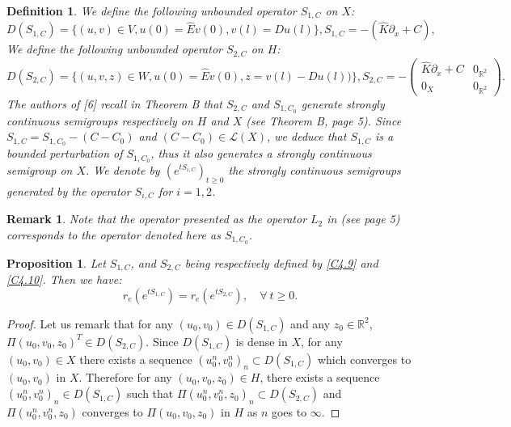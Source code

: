 \documentclass[10pt, english]{article}
\newtheorem{prop}[thm]{Proposition}
\newtheorem{dfn}[thm]{Definition}
\newtheorem{oss}[thm]{Remark}
\begin{document}
{\begin{dfn}
We define the following unbounded operator $S_{1,C}$ on $X$:
\begin{equation}\label{C4.9}%
D(S_{1,C})=\{(u,v) \in V, u(0)=\widehat{E}v(0), v(l)=Du(l)\}, S_{1,C}=-(\widehat{K}\partial_x +C),
\end{equation}
We define the following unbounded operator $S_{2,C}$ on $H$:
\begin{equation}\label{C4.10}%
D(S_{2,C})=\{(u,v,z) \in W, u(0)=\widehat{E}v(0), z=v(l)-Du(l))\}, S_{2,C}=
-\begin{pmatrix}
\widehat{K}\partial_x +C  & 0_{\mathbb{R}^2}\\
0_X & 0_{\mathbb{R}^2}
\end{pmatrix}.
\end{equation}
The authors of [6] recall in Theorem B that $S_{2,C}$ and $S_{1,C_0}$ generate strongly continuous semigroups respectively on $H$ and $X$ (see Theorem B, page 5). Since $S_{1,C}=S_{1,C_0} -(C-C_0)$ and $(C-C_0) \in \mathcal{L}(X)$, we deduce that $S_{1,C}$ is a bounded perturbation of $S_{1,C_0}$, thus it also generates a strongly continuous semigroup on $X$.
We denote by $(e^{tS_{i,C}})_{t \geqslant 0}$ the strongly continuous semigroups generated by the operator $S_{i,C}$ for $i=1,2$.
\end{dfn}
\begin{oss}\label{L2C_0}
Note that the operator presented as the operator $L_2$ in \cite{SW2003} (see page 5) corresponds to the operator denoted here as $S_{1,C_0}$.
\end{oss}

\begin{prop}\label{P1}
Let $S_{1,C}$, and $S_{2,C}$ being respectively defined by \eqref{C4.9} and \eqref{C4.10}. Then we have:
\begin{equation}\label{C4.11}%
r_e(e^{tS_{1,C}})=r_e(e^{tS_{2,C}}), \quad \forall \ t \geqslant 0.
\end{equation}
\end{prop}
\begin{proof}
Let us remark that for any $(u_0,v_0) \in D(S_{1,C})$ and any $z_0 \in \mathbb{R}^2$, $\Pi(u_0,v_0, z_0)^T \in D(S_{2,C})$.
Since $D(S_{1,C})$ is dense in $X$, for any $(u_0,v_0) \in X$ there exists a sequence $(u_0^n,v_0^n)_n \subset D(S_{1,C})$ which converges to $(u_0,v_0)$ in $X$. 
Therefore for any  $(u_0,v_0,z_0) \in H$, there exists a sequence $(u_0^n,v_0^n)_n \in D(S_{1,C})$ such that $\Pi(u_0^n,v_0^n, z_0)_n \subset D(S_{2,C})$ and $\Pi(u_0^n,v_0^n, z_0)$ converges to
$\Pi(u_0,v_0, z_0)$ in $H$ as $n$ goes to $\infty$.


\end{proof}}
\end{document}
